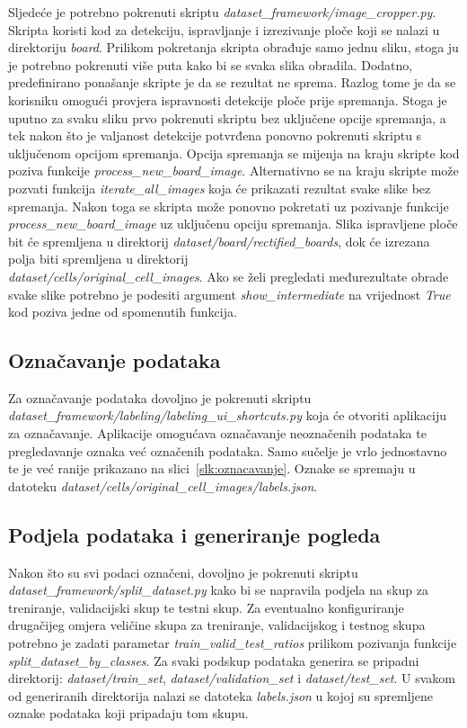\documentclass[diplomskirad]{fer}
\begin{document}
			Sljedeće je potrebno pokrenuti skriptu \textit{dataset\_framework/image\_cropper.py}. Skripta koristi kod za detekciju, ispravljanje i izrezivanje ploče koji se nalazi u direktoriju \textit{board}. Prilikom pokretanja skripta obrađuje samo jednu sliku, stoga ju je potrebno pokrenuti više puta kako bi se svaka slika obradila. Dodatno, predefinirano ponašanje skripte je da se rezultat ne sprema. Razlog tome je da se korisniku omogući provjera ispravnosti detekcije ploče prije spremanja. Stoga je uputno za svaku sliku prvo pokrenuti skriptu bez uključene opcije spremanja, a tek nakon što je valjanost detekcije potvrđena ponovno pokrenuti skriptu s uključenom opcijom spremanja. Opcija spremanja se mijenja na kraju skripte kod poziva funkcije \textit{process\_new\_board\_image}. Alternativno se na kraju skripte može pozvati funkcija \textit{iterate\_all\_images} koja će prikazati rezultat svake slike bez spremanja. Nakon toga se skripta može ponovno pokretati uz pozivanje funkcije \textit{process\_new\_board\_image} uz uključenu opciju spremanja. Slika ispravljene ploče bit će spremljena u direktorij \textit{dataset/board/rectified\_boards}, dok će izrezana polja biti spremljena u direktorij\\\textit{dataset/cells/original\_cell\_images}. Ako se želi pregledati međurezultate obrade svake slike potrebno je podesiti argument \textit{show\_intermediate} na vrijednost \textit{True} kod poziva jedne od spomenutih funkcija.
		
		\subsection{Označavanje podataka}
			Za označavanje podataka dovoljno je pokrenuti skriptu\\\textit{dataset\_framework/labeling/labeling\_ui\_shortcuts.py} koja će otvoriti aplikaciju za označavanje. Aplikacije omogućava označavanje neoznačenih podataka te pregledavanje oznaka već označenih podataka. Samo sučelje je vrlo jednostavno te je već ranije prikazano na slici~\ref{slk:oznacavanje}. Oznake se spremaju u datoteku \textit{dataset/cells/original\_cell\_images/labels.json}.
		
		\subsection{Podjela podataka i generiranje pogleda}
			Nakon što su svi podaci označeni, dovoljno je pokrenuti skriptu \textit{dataset\_framework/split\_dataset.py} kako bi se napravila podjela na skup za treniranje, validacijski skup te testni skup. Za eventualno konfiguriranje drugačijeg omjera veličine skupa za treniranje, validacijskog i testnog skupa potrebno je zadati parametar \textit{train\_valid\_test\_ratios} prilikom pozivanja funkcije \textit{split\_dataset\_by\_classes}. Za svaki podskup podataka generira se pripadni direktorij: \textit{dataset/train\_set}, \textit{dataset/validation\_set} i \textit{dataset/test\_set}. U svakom od generiranih direktorija nalazi se datoteka \textit{labels.json} u kojoj su spremljene oznake podataka koji pripadaju tom skupu.
			
\end{document}
